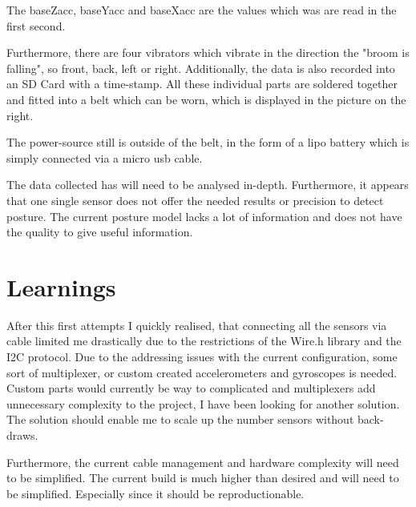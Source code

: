 The baseZacc, baseYacc and baseXacc are the values which was are read in the first second. 

Furthermore, there are four vibrators which vibrate in the direction the "broom is falling", so front, back, left or right. Additionally, the data is also recorded into an SD Card with a time-stamp. All these individual parts are soldered together and fitted into a belt which can be worn, which is displayed in the picture on the right.

The power-source still is outside of the belt, in the form of a \gls{lipo battery} which is simply connected via a micro usb cable.

The data collected has will need to be analysed in-depth. Furthermore, it appears that one single sensor does not offer the needed results or precision to detect posture. The current posture model lacks a lot of information and does not have the quality to give useful information. 

\section{Learnings}

After this first attempts I quickly realised, that connecting all the sensors via cable limited me drastically due to the restrictions of the Wire.h library and the I2C protocol. Due to the addressing issues with the current configuration, some sort of multiplexer, or custom created accelerometers and gyroscopes is needed. Custom parts would currently be way to complicated and multiplexers add unnecessary complexity to the project, I have been looking for another solution. The solution should enable me to scale up the number sensors without back-draws.

Furthermore, the current cable management and hardware complexity will need to be simplified. The current build is much higher than desired and will need to be simplified. Especially since it should be reproductionable.

